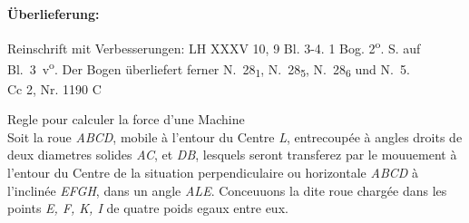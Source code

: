 \begin{ledgroupsized}[r]{120mm}
\footnotesize 
\pstart 
\noindent\textbf{\"{U}berlieferung:}
\pend
\end{ledgroupsized}
\begin{ledgroupsized}[r]{114mm}
\footnotesize 
\pstart \parindent -6mm
%
Reinschrift mit Verbesserungen:
LH XXXV 10, 9 Bl. 3-4. 1 Bog. 2\textsuperscript{o}.  S. auf Bl.~3~v\textsuperscript{o}. Der Bogen überliefert ferner N.~28\textsubscript{1}, N.~28\textsubscript{5}, N.~28\textsubscript{6} und N.~5.
\\
Cc 2, Nr. 1190 C
\pend
\end{ledgroupsized}

\vspace*{8mm}
\count{}
\count{}
\pstart 
\normalsize
\noindent
[3~v\textsuperscript{o}]
\pend
\pstart
\centering
\noindent
Regle  pour calculer la force d'une Machine\protect{}\protect{}\\%
\pend
\vspace*{1.0em}
\pstart 
\noindent
Soit la roue \textit{ABCD}, mobile \`{a} l'entour du Centre \textit{L}, entrecoup\'{e}e \`{a} angles droits de deux diametres solides \textit{AC}, et \textit{DB}, lesquels seront transferez par le mouuement \`{a} l'entour du Centre de la situation perpendiculaire ou horizontale \textit{ABCD} \`{a} l'inclin\'{e}e \textit{EFGH}, dans un angle  \textit{ALE}.
\pend 
\pstart Conceuuons la dite roue charg\'{e}e dans les points \textit{E, F, K, I} de quatre poids egaux entre eux.
